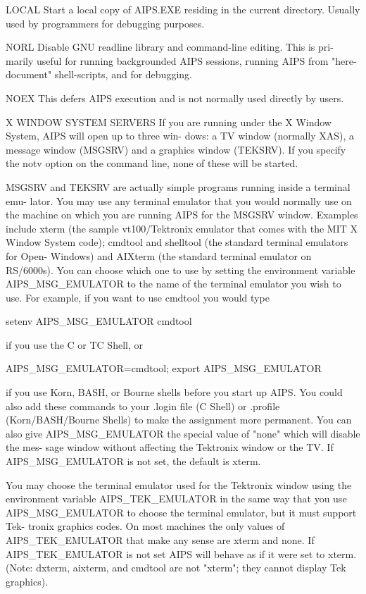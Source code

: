        LOCAL   Start a local copy of AIPS.EXE  residing  in  the  current  directory.
               Usually used by programmers for debugging purposes.

       NORL    Disable  GNU  readline library and command-line editing.  This is pri-
               marily useful for running backgrounded  AIPS  sessions,  running  AIPS
               from "here-document" shell-scripts, and for debugging.

       NOEX    This defers AIPS execution and is not normally used directly by users.


X WINDOW SYSTEM SERVERS
       If  you are running under the X Window System, AIPS will open up to three win-
       dows: a TV window (normally XAS), a message window  (MSGSRV)  and  a  graphics
       window  (TEKSRV).  If you specify the notv option on the command line, none of
       these will be started.

       MSGSRV and TEKSRV are actually simple programs running inside a terminal  emu-
       lator.   You  may use any terminal emulator that you would normally use on the
       machine on which you are running AIPS for the MSGSRV window.  Examples include
       xterm  (the  sample  vt100/Tektronix emulator that comes with the MIT X Window
       System code); cmdtool and shelltool (the standard terminal emulators for Open-
       Windows)  and  AIXterm  (the standard terminal emulator on RS/6000s).  You can
       choose which one to use by setting the environment variable  AIPS_MSG_EMULATOR
       to  the  name  of  the terminal emulator you wish to use.  For example, if you
       want to use cmdtool you would type

       setenv AIPS_MSG_EMULATOR cmdtool

       if you use the C or TC Shell, or

       AIPS_MSG_EMULATOR=cmdtool; export AIPS_MSG_EMULATOR

       if you use Korn, BASH, or Bourne shells before you start up AIPS.   You  could
       also   add   these  commands  to  your  .login  file  (C  Shell)  or  .profile
       (Korn/BASH/Bourne Shells) to make the assignment more permanent.  You can also
       give AIPS_MSG_EMULATOR the special value of "none" which will disable the mes-
       sage  window  without  affecting  the  Tektronix  window  or   the   TV.    If
       AIPS_MSG_EMULATOR is not set, the default is xterm.

       You  may  choose the terminal emulator used for the Tektronix window using the
       environment  variable  AIPS_TEK_EMULATOR  in  the  same  way  that   you   use
       AIPS_MSG_EMULATOR  to  choose  the terminal emulator, but it must support Tek-
       tronix graphics codes.  On most machines the only values of  AIPS_TEK_EMULATOR
       that  make any sense are xterm and none.  If AIPS_TEK_EMULATOR is not set AIPS
       will behave as if it were set to xterm.  (Note: dxterm, aixterm,  and  cmdtool
       are not "xterm"; they cannot display Tek graphics).

